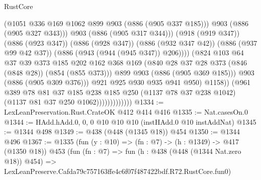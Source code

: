 \begin{lexlean}{RustCore}
\begin{coremodule}
                                          (@1051 @336 @169 @1062 @899 @903 (@886 (@905 @337 @185)))
                                          @903
                                          (@886 (@905 @327 @343)))
                                        @903
                                        (@886 (@905 @317 @344)))
                                      (@918 (@919 @347))
                                      (@886 (@923 @347))
                                      (@886 (@928 @347))
                                      (@886 (@932 @347 @42))
                                      (@886 (@937 @99 @42 @37))
                                      (@886 (@943 (@944 (@945 @347)) @206))))
                                  (@824
                                    @103
                                    @64
                                    @37
                                    @39
                                    @373
                                    @185
                                    @202
                                    @162
                                    @368
                                    @169
                                    (@840 @28 @37 @28 @373 (@846 (@848 @28)) (@854 (@855 @373)))
                                    @899
                                    @903
                                    (@886 (@905 @369 @185)))
                                  @903
                                  (@886 (@905 @309 @376)))
                                @921
                                @925
                                @930
                                @935
                                @941
                                @950)
                              @1158))
                          (@961
                            @389
                            @78
                            @81
                            @37
                            @185
                            @238
                            @185
                            @250
                            (@1137 @78 @37 @238 @1042)
                            (@1137 @81 @37 @250 @1062)))))))))))))
@1334 := LexLeanPreservation.Rust.CrateOK @412 @414 @416
@1335 := Nat.casesOn.{0}
@1344 := HAdd.hAdd.{0, 0, 0} @10 @10 @10 (instHAdd.{0} @10 instAddNat)
@1345 := @1344 @498
@1349 := @438 (@448 (@1345 @18)) @454
@1350 := @1344 @496
@1367 := @1335
    (fun (y : @10) => (fn : @7) -> (h : @1349) -> @417 (@1350 @18))
    @453
    (fun (fn : @7) =>
    fun (h : @438 (@448 (@1344 Nat.zero @18)) @454) =>
    LexLeanPreserve.Cafda79c757163ffe4c6f07f487422bdf.R72.RustCore.fun0)

\end{coremodule}
\end{lexlean}
